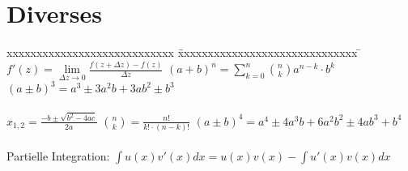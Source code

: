 \section{Diverses}\label{Diverses}
\begin{tabbing}
  xxxxxxxxxxxxxxxxxxxxxxxxxxxx \= xxxxxxxxxxxxxxxxxxxxxxxxxxxxxx \= \kill
  $f'(z) = \lim \limits_{\Delta z \rightarrow 0} \frac{f(z + \Delta z) -
  f(z)}{\Delta z}$ \> $(a + b)^n = \sum_{k=0}^{n} \binom n k a^{n-k} \cdot b^k$ \>
  $(a \pm b)^3 =a^3 \pm  3 a^{2} b + 3 a b^2 \pm b^3 $\\ \\
  $x_{1,2} = \frac{-b \pm \sqrt{b^2 - 4ac}}{2a}$ \> $\binom n k = \frac{n!}{k!
  \cdot (n-k)!}$ \> $(a \pm b)^4 =a^4 \pm  4 a^{3} b + 6a^2b^2 \pm 4 a b^3 +
  b^4$\\ 
  \\Partielle Integration: $\int u(x) v'(x) dx = u(x)v(x) - \int u'(x) v(x) dx$
\end{tabbing}
